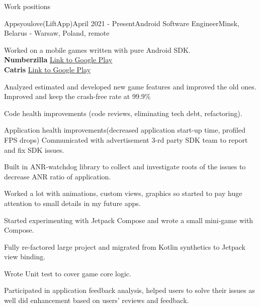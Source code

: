 \documentclass{resume} %
\begin{document}
\begin{rSection}{Work positions}

\begin{rSubsection}{Appsyoulove(LiftApp)}{April 2021 - Present}{Android Software Engineer}{Minsk, Belarus - Warsaw, Poland, remote}
\item[]Worked on a mobile games written with pure Android SDK.\smallskip \\
\textbf{Numberzilla}  \hfill\underline{\href{https://play.google.com/store/apps/details?id=com.appcraft.number.puzzle&hl=en}{Link to Google Play}}\\
\textbf{Catris}  \hfill\underline{\href{https://play.google.com/store/apps/details?id=com.appcraft.merge.game&hl=en}{Link to Google Play}}
\item Analyzed estimated and developed new game features and improved the old ones. Improved and keep the crash-free rate at 99.9\%
\item Code health improvements (code reviews, eliminating tech debt, refactoring).
\item Application health improvements(decreased application start-up time, profiled FPS drops) Communicated with advertisement 3-rd party SDK team to report and fix SDK issues. 
\item Built in ANR-watchdog library to collect and investigate roots of the issues to decrease ANR ratio of application.
\item Worked a lot with animations, custom views, graphics so started to pay huge attention to small details in my future apps.
\item Started experimenting with Jetpack Compose and wrote a small mini-game with Compose.
\item Fully re-factored large project and migrated from Kotlin synthetics to Jetpack view binding.
\item Wrote Unit test to cover game core logic.
\item Participated in application feedback analysis, helped users to solve their issues as well did enhancement based on users' reviews and feedback.
\end{rSubsection}



\end{rSection}
\end{document}
